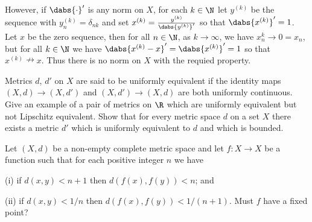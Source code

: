 \begin{solution}[\bf Solution.]
However, if $\dabs{\cdot}'$ is any norm on $X$, for each $k\in\N$ let $y^{(k)}$ be the sequence with $y_n^{(k)} = \delta_{nk}$ and set $x^{(k)} = \frac{y^{(k)}}{\dabs{y^{(k)}}'}$ so that $\dabs{x^{(k)}}' = 1$. Let $x$ be the zero sequence, then for all $n\in\N$, as $k\to \infty$, we have $x_n^{k} \to 0 = x_n$, but for all $k\in\N$ we have $\dabs{x^{(k)}-x}' = \dabs{x^{(k)}}' = 1$ so that $x^{(k)}\nrightarrow x$. Thus there is no norm on $X$ with the requied property. 



\end{solution}

\begin{problem}Metrics $d$, $d'$ on $X$ are said to be uniformly equivalent if the identity maps $(X, d) \to (X, d')$ and $(X, d') \to (X, d)$ are both uniformly continuous. Give an example of a pair of metrics on $\R$ which are uniformly equivalent but not Lipschitz equivalent. Show that for every metric space $d$
on a set $X$ there exists a metric $d'$ which is uniformly equivalent to $d$ and which is bounded.



\end{problem}

\begin{solution}[\bf Solution.]



\end{solution}

\begin{problem}Let $(X, d)$ be a non-empty complete metric space and let $f : X \to X$ be a function such that for each positive integer $n$ we have
\ben
\item [(i)] if $d(x, y) < n + 1$ then $d(f(x), f(y)) < n$; and
\item [(ii)] if $d(x, y) < 1/n$ then $d(f(x), f(y)) < 1/(n + 1)$.
\een
Must $f$ have a fixed point?



\end{problem}

